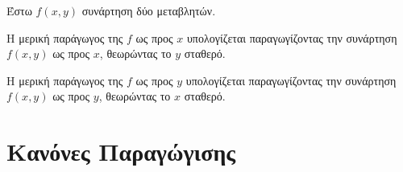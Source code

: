 Έστω $ f(x,y) $ συνάρτηση δύο μεταβλητών. 
\begin{myitemize}
  \item Η μερική παράγωγος της $f$ ως προς $x$ υπολογίζεται παραγωγίζοντας 
    την συνάρτηση $ f(x,y) $ ως προς $x$, θεωρώντας το $y$ σταθερό. 
  \item Η μερική παράγωγος της $f$ ως προς $y$ υπολογίζεται παραγωγίζοντας 
    την συνάρτηση $ f(x,y) $ ως προς $y$, θεωρώντας το $x$ σταθερό. 
\end{myitemize}

\section{Κανόνες Παραγώγισης}


